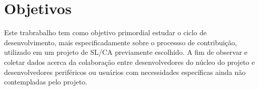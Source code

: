 % 
% 
% 
% 

\section{Objetivos} \label{sec:objetivos}


Este trabrabalho tem como objetivo primordial estudar o ciclo de desenvolvimento, mais especificadamente sobre o processso de contribuição, utilizado em um projeto de SL/CA previamente escolhido. A fim de observar e coletar dados acerca da colaboração entre desenvolvedores do núcleo do projeto e desenvolvedores periféricos ou usuários com necessidades específicas ainda não contempladas pelo projeto.

